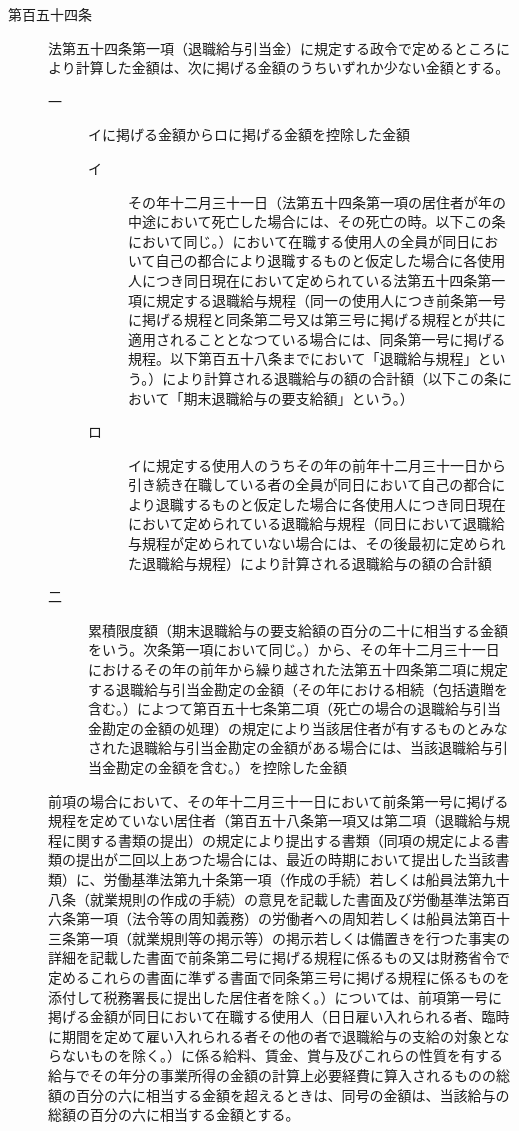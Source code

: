 \documentclass[twocolumn,a4j,10pt]{ltjtarticle}
\begin{document}
\begin{description}
\item[第百五十四条]法第五十四条第一項（退職給与引当金）に規定する政令で定めるところにより計算した金額は、次に掲げる金額のうちいずれか少ない金額とする。
\begin{description}
\item[一]イに掲げる金額からロに掲げる金額を控除した金額
\begin{description}
\item[イ]その年十二月三十一日（法第五十四条第一項の居住者が年の中途において死亡した場合には、その死亡の時。以下この条において同じ。）において在職する使用人の全員が同日において自己の都合により退職するものと仮定した場合に各使用人につき同日現在において定められている法第五十四条第一項に規定する退職給与規程（同一の使用人につき前条第一号に掲げる規程と同条第二号又は第三号に掲げる規程とが共に適用されることとなつている場合には、同条第一号に掲げる規程。以下第百五十八条までにおいて「退職給与規程」という。）により計算される退職給与の額の合計額（以下この条において「期末退職給与の要支給額」という。）
\item[ロ]イに規定する使用人のうちその年の前年十二月三十一日から引き続き在職している者の全員が同日において自己の都合により退職するものと仮定した場合に各使用人につき同日現在において定められている退職給与規程（同日において退職給与規程が定められていない場合には、その後最初に定められた退職給与規程）により計算される退職給与の額の合計額
\end{description}
\item[二]累積限度額（期末退職給与の要支給額の百分の二十に相当する金額をいう。次条第一項において同じ。）から、その年十二月三十一日におけるその年の前年から繰り越された法第五十四条第二項に規定する退職給与引当金勘定の金額（その年における相続（包括遺贈を含む。）によつて第百五十七条第二項（死亡の場合の退職給与引当金勘定の金額の処理）の規定により当該居住者が有するものとみなされた退職給与引当金勘定の金額がある場合には、当該退職給与引当金勘定の金額を含む。）を控除した金額
\end{description}
\item[]前項の場合において、その年十二月三十一日において前条第一号に掲げる規程を定めていない居住者（第百五十八条第一項又は第二項（退職給与規程に関する書類の提出）の規定により提出する書類（同項の規定による書類の提出が二回以上あつた場合には、最近の時期において提出した当該書類）に、労働基準法第九十条第一項（作成の手続）若しくは船員法第九十八条（就業規則の作成の手続）の意見を記載した書面及び労働基準法第百六条第一項（法令等の周知義務）の労働者への周知若しくは船員法第百十三条第一項（就業規則等の掲示等）の掲示若しくは備置きを行つた事実の詳細を記載した書面で前条第二号に掲げる規程に係るもの又は財務省令で定めるこれらの書面に準ずる書面で同条第三号に掲げる規程に係るものを添付して税務署長に提出した居住者を除く。）については、前項第一号に掲げる金額が同日において在職する使用人（日日雇い入れられる者、臨時に期間を定めて雇い入れられる者その他の者で退職給与の支給の対象とならないものを除く。）に係る給料、賃金、賞与及びこれらの性質を有する給与でその年分の事業所得の金額の計算上必要経費に算入されるものの総額の百分の六に相当する金額を超えるときは、同号の金額は、当該給与の総額の百分の六に相当する金額とする。
\end{description}
\end{document}
